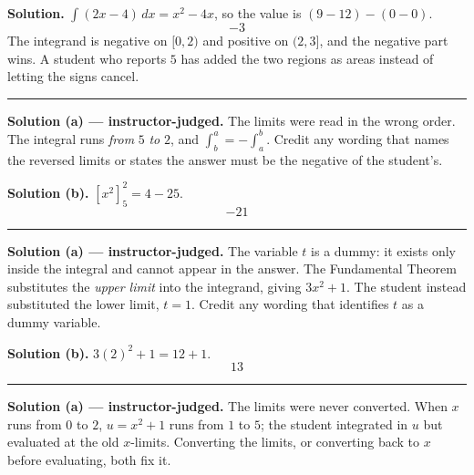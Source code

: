 \documentclass[12pt]{article}
\begin{document}



\textbf{Solution.} $\int (2x-4)\,dx = x^2 - 4x$, so the value is
$(9 - 12) - (0 - 0)$.
\[ \boxed{-3} \]
The integrand is negative on $[0,2)$ and positive on $(2,3]$, and the negative
part wins. A student who reports $5$ has added the two regions as areas instead
of letting the signs cancel.

\vspace{0.15cm}\noindent\rule{\linewidth}{0.2pt}


\textbf{Solution (a) --- instructor-judged.} The limits were read in the wrong
order. The integral runs \emph{from} $5$ \emph{to} $2$, and
$\int_b^a = -\int_a^b$. Credit any wording that names the reversed limits or
states the answer must be the negative of the student's.

\textbf{Solution (b).} $\left[x^2\right]_5^2 = 4 - 25$.
\[ \boxed{-21} \]

\vspace{0.15cm}\noindent\rule{\linewidth}{0.2pt}


\textbf{Solution (a) --- instructor-judged.} The variable $t$ is a dummy: it
exists only inside the integral and cannot appear in the answer. The
Fundamental Theorem substitutes the \emph{upper limit} into the integrand,
giving $3x^2 + 1$. The student instead substituted the lower limit, $t = 1$.
Credit any wording that identifies $t$ as a dummy variable.

\textbf{Solution (b).} $3(2)^2 + 1 = 12 + 1$.
\[ \boxed{13} \]

\vspace{0.15cm}\noindent\rule{\linewidth}{0.2pt}


\textbf{Solution (a) --- instructor-judged.} The limits were never converted.
When $x$ runs from $0$ to $2$, $u = x^2 + 1$ runs from $1$ to $5$; the student
integrated in $u$ but evaluated at the old $x$-limits. Converting the limits, or
converting back to $x$ before evaluating, both fix it.
\end{document}
